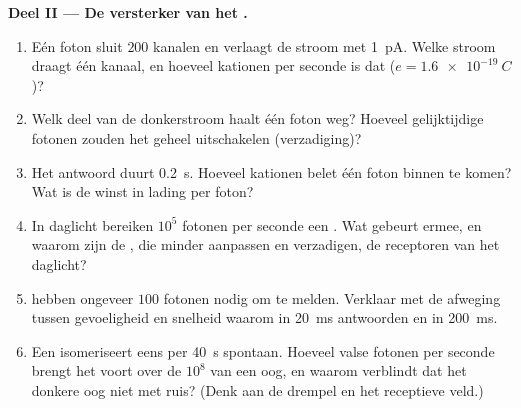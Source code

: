 \begin{problem}
\medskip
\noindent\textbf{Deel II --- De versterker van het .}
\begin{enumerate}[resume]
  \item Eén foton sluit $200$ kanalen en verlaagt de stroom met
        \qty{1}{pA}. Welke stroom draagt één kanaal, en hoeveel
        kationen per seconde is dat ($e = \qty{1.6e-19}{C}$)?
  \item Welk deel van de donkerstroom haalt één foton weg? Hoeveel
        gelijktijdige fotonen zouden het  geheel uitschakelen
        (verzadiging)?
  \item Het antwoord duurt \qty{0.2}{s}. Hoeveel kationen belet één
        foton binnen te komen? Wat is de winst in lading per foton?
  \item In daglicht bereiken $10^{5}$ fotonen per seconde een .
        Wat gebeurt ermee, en waarom zijn de , die minder
        aanpassen en verzadigen, de receptoren van het daglicht?
  \item {} hebben ongeveer $100$ fotonen nodig om te melden.
        Verklaar met de afweging tussen gevoeligheid en snelheid waarom
         in \qty{20}{ms} antwoorden en  in
        \qty{200}{ms}.
  \item Een  isomeriseert eens per \qty{40}{s} spontaan.
        Hoeveel valse fotonen per seconde brengt het  voort
        over de $10^{8}$  van een oog, en waarom verblindt dat
        het donkere oog niet met ruis? (Denk aan de drempel en het
        receptieve veld.)
\end{enumerate}


\end{problem}
